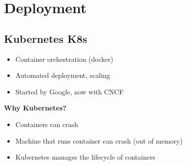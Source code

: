 
\section{Deployment}
\subsection{Kubernetes K8s}
\begin{itemize}
    \item Container orchestration (docker)
    \item Automated deployment, scaling
    \item Started by Google, now with CNCF
\end{itemize}
\textbf{Why Kubernetes?}
\begin{itemize}
    \item Containers can crash
    \item Machine that runs container can crash (out of memory)
    \item Kubernetes manages the lifecycle of containers
\end{itemize}


